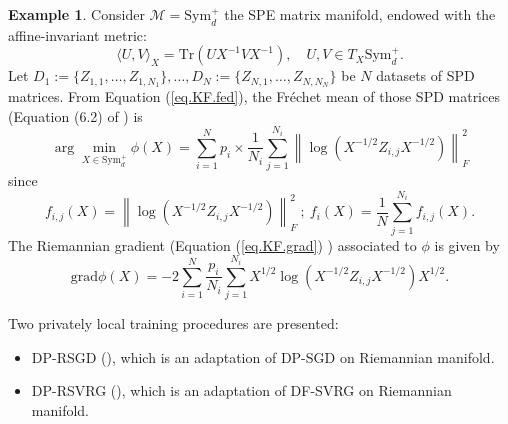 \documentclass[10pt,a4paper]{book}
\theoremstyle{definition}
\newtheorem{exm}{Example}[section]
\theoremstyle{plain}
\theoremstyle{remark}
\newcommand{\grad}{\textrm{grad}}
\newcommand \M {\mathcal{M}}
\begin{document}
\begin{exm}
Consider $\M=\text{Sym}_{d}^{+}$ the SPE matrix manifold, endowed with the affine-invariant metric:
$$\langle U,V\rangle_{X}=\text{Tr}(UX^{-1}VX^{-1}),\quad U,V \in T_X\text{Sym}_d^{+}.$$
Let $D_1:=\{Z_{1,1},\dots, Z_{1,N_1}\},\dots, D_N:=\{Z_{N,1},\dots, Z_{N,N_N}\}$ be $N$ datasets of SPD matrices.  From Equation (\ref{eq.KF.fed}), the Fréchet mean of those SPD matrices (Equation (6.2) of \cite{huang2024federated}) is
$$\arg\min_{X\in \text{Sym}_{d}^{+}}\phi(X)= \sum_{i=1}^{N}p_i\times \frac{1}{N_i}\sum_{j=1}^{N_i}\left\|\log(X^{-1/2}Z_{i,j}X^{-1/2})\right\|_{F}^{2}$$
since
$$f_{i,j}(X)=\left\|\log(X^{-1/2}Z_{i,j}X^{-1/2})\right\|_{F}^{2}~;~f_i(X)=\frac{1}{N}\sum_{j=1}^{N_i}f_{i,j}(X).$$
The Riemannian gradient (Equation (\ref{eq.KF.grad}) ) associated to $\phi$ is given by
$$
\grad \phi(X)=-2\sum_{i=1}^{N}\frac{p_i}{N_i}\sum_{j=1}^{N_i}X^{1/2}\log(X^{-1/2}Z_{i,j}X^{-1/2})X^{1/2}.$$

\end{exm}

Two privately local training procedures are presented:
\begin{itemize}
\item DP-RSGD (\cite{han2024differentially}), which is an adaptation of DP-SGD on Riemannian manifold.
\item DP-RSVRG (\cite{utpala2022improved}), which is an adaptation of DF-SVRG on Riemannian manifold.
\end{itemize}
\newpage 




\end{document}
